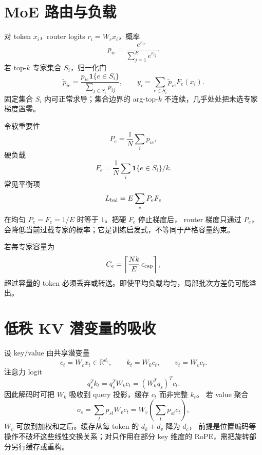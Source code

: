 \documentclass[11pt]{article}
\numberwithin{equation}{section}
\newcommand{\R}{\mathbb{R}}
\newcommand{\1}{\mathbf{1}}
\begin{document}
\section{MoE 路由与负载}

对 token $x_i$，router logits $r_i=W_rx_i$，概率
\begin{equation}
 p_{ie}=\frac{e^{r_{ie}}}{\sum_{j=1}^{E}e^{r_{ij}}}.
\end{equation}
若 top-$k$ 专家集合 $S_i$，归一化门
\begin{equation}
 \widetilde p_{ie}=\frac{p_{ie}\1\{e\in S_i\}}
 {\sum_{j\in S_i}p_{ij}},
 \qquad
 y_i=\sum_{e\in S_i}\widetilde p_{ie}F_e(x_i).
\end{equation}
固定集合 $S_i$ 内可正常求导；集合边界的 arg-top-$k$ 不连续，几乎处处把未选专家梯度置零。

令软重要性
\begin{equation}
 P_e=\frac1N\sum_ip_{ie},
\end{equation}
硬负载
\begin{equation}
 F_e=\frac1N\sum_i\1\{e\in S_i\}/k.
\end{equation}
常见平衡项
\begin{equation}
 L_{\rm bal}=E\sum_eP_eF_e
\end{equation}
在均匀 $P_e=F_e=1/E$ 时等于 $1$。把硬 $F_e$ 停止梯度后，
router 梯度只通过 $P_e$，会降低当前过载专家的概率；它是训练启发式，不等同于严格容量约束。

若每专家容量为
\begin{equation}
 C_e=\left\lceil\frac{Nk}{E}\,c_{\rm cap}\right\rceil,
\end{equation}
超过容量的 token 必须丢弃或转送。即使平均负载均匀，局部批次方差仍可能溢出。

\section{低秩 KV 潜变量的吸收}

设 key/value 由共享潜变量
\begin{equation}
 c_t=W_cx_t\in\R^{d_c},\qquad
 k_t=W_kc_t,\qquad v_t=W_vc_t.
\end{equation}
注意力 logit
\begin{equation}
 q_s^Tk_t=q_s^TW_kc_t=(W_k^Tq_s)^Tc_t.
\end{equation}
因此解码时可把 $W_k$ 吸收到 query 投影，缓存 $c_t$ 而非完整 $k_t$。
若 value 聚合
\begin{equation}
 o_s=\sum_tp_{st}W_vc_t=W_v\left(\sum_tp_{st}c_t\right),
\end{equation}
$W_v$ 可放到加权和之后。缓存从每 token 的 $d_k+d_v$ 降为 $d_c$，
前提是位置编码等操作不破坏这些线性交换关系；对只作用在部分 key 维度的 RoPE，需把旋转部分另行缓存或重构。
\end{document}
